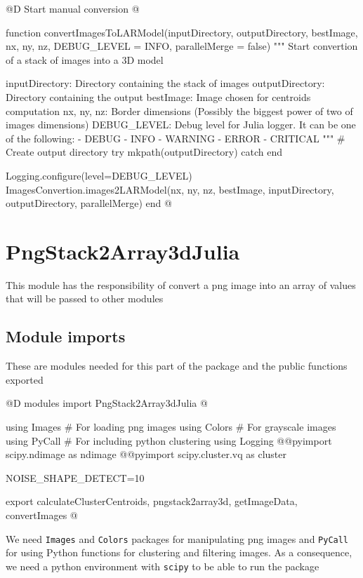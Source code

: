 \documentclass[11pt,oneside]{article}	%
\begin{document}
@D Start manual conversion
@{function convertImagesToLARModel(inputDirectory, outputDirectory, bestImage,
                                 nx, ny, nz, DEBUG_LEVEL = INFO, parallelMerge = false)
  """
  Start convertion of a stack of images into a 3D model

  inputDirectory: Directory containing the stack of images
  outputDirectory: Directory containing the output
  bestImage: Image chosen for centroids computation
  nx, ny, nz: Border dimensions (Possibly the biggest power of two of images dimensions)
  DEBUG_LEVEL: Debug level for Julia logger. It can be one of the following:
    - DEBUG
    - INFO
    - WARNING
    - ERROR
    - CRITICAL
  """
  # Create output directory
  try
    mkpath(outputDirectory)
  catch
  end

  Logging.configure(level=DEBUG_LEVEL)
  ImagesConvertion.images2LARModel(nx, ny, nz, bestImage,
	  inputDirectory, outputDirectory, parallelMerge)
end
@}

\section{PngStack2Array3dJulia}\label{sec:PngStack2Array3dJulia}

This module has the responsibility of convert a png image into an array of values
that will be passed to other modules

\subsection{Module imports}\label{sec:imports}
These are modules needed for this part of the package and the public functions exported

@D modules import PngStack2Array3dJulia
@{using Images # For loading png images
using Colors # For grayscale images
using PyCall # For including python clustering
using Logging
@@pyimport scipy.ndimage as ndimage
@@pyimport scipy.cluster.vq as cluster

NOISE_SHAPE_DETECT=10

export calculateClusterCentroids, pngstack2array3d, getImageData, convertImages
@}

We need \texttt{Images} and \texttt{Colors} packages for manipulating png images and \texttt{PyCall} for using Python functions for clustering and filtering images.
As a consequence, we need a python environment with \texttt{scipy} to be able to run the package
\end{document}
